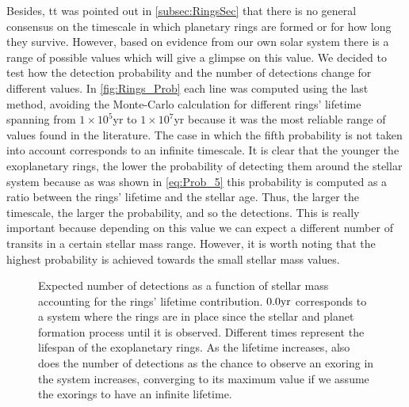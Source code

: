 Besides, tt was pointed out in \autoref{subsec:RingsSec} that there is no general consensus on the timescale in which planetary rings are formed or for how long they survive. However, based on evidence from our own solar system there is a range of possible values which will give a glimpse on this value. We decided to test how the detection probability and the number of detections change for different values. In \autoref{fig:Rings_Prob} each line was computed using the last method, avoiding the Monte-Carlo calculation for different rings' lifetime spanning from $1\times 10^5$yr to $1\times 10^7$yr because it was the most reliable range of values found in the literature. The case in which the fifth probability is not taken into account corresponds to an infinite timescale. It is clear that the younger the exoplanetary rings, the lower the probability of detecting them around the stellar system because as was shown in \autoref{eq:Prob_5} this probability is computed as a ratio between the rings' lifetime and the stellar age. Thus, the larger the timescale, the larger the probability, and so the detections. This is really important because depending on this value we can expect a different number of transits in a certain stellar mass range. However, it is worth noting that the highest probability is achieved towards the small stellar mass values.\\

\begin{figure}[!ht]
\centering
\caption{\scriptsize{Expected number of detections as a function of stellar mass accounting for the rings' lifetime contribution. $0.0 \textnormal{yr}$ corresponds to a system where the rings are in place since the stellar and planet formation process until it is observed. Different times represent the lifespan of the exoplanetary rings. As the lifetime increases, also does the number of detections as the chance to observe an exoring in the system increases, converging to its maximum value if we assume the exorings to have an infinite lifetime.}}
\label{fig:Rings_Prob}
\end{figure}

